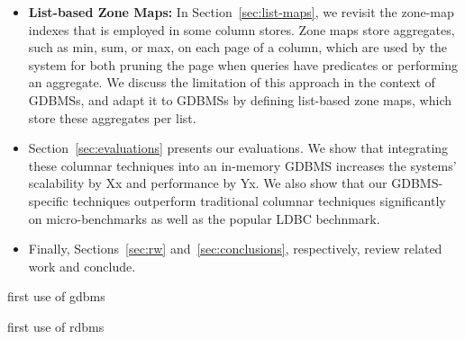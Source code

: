 \begin{itemize}
	\item {\bf List-based Zone Maps:} In Section~\ref{sec:list-maps}, we revisit the zone-map~\cite{} indexes that  is employed in some column stores. Zone maps store aggregates, such as min, sum, or max, on each page of a column, which are used by the system for both pruning the page when queries have predicates or performing an aggregate. We discuss the limitation of this approach in the context of GDBMSs, and adapt it to GDBMSs by defining list-based zone maps, which store these aggregates per list.
	
	\item Section~\ref{sec:evaluations} presents our evaluations. We show that integrating these columnar techniques into an in-memory GDBMS increases the systems' scalability by Xx and performance by Yx. We also show that our GDBMS-specific techniques outperform traditional columnar techniques significantly on micro-benchmarks as well as the popular LDBC bechnmark.
	
	\item Finally, Sections~\ref{sec:rw} and~\ref{sec:conclusions}, respectively, review related work and conclude.   
\end{itemize}



first use of \gls{gdbms}

first use of \gls{rdbms}